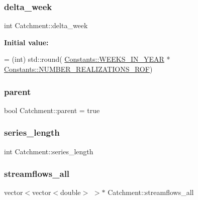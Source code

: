 \subsubsection{\texorpdfstring{delta\+\_\+week}{delta\_week}}
{\footnotesize\ttfamily int Catchment\+::delta\+\_\+week\hspace{0.3cm}{\ttfamily [protected]}}

{\bfseries Initial value\+:}
\begin{DoxyCode}
= (int) std::round(
            \mbox{\hyperlink{namespaceConstants_a19e84af3cbc6e1318beb22408c2a1f2f}{Constants::WEEKS\_IN\_YEAR}} * 
      \mbox{\hyperlink{namespaceConstants_ad6b1922ee031afa4b93176968d060fdf}{Constants::NUMBER\_REALIZATIONS\_ROF}})
\end{DoxyCode}
\mbox{\label{classCatchment_a472ff6892f90d94b8c4dba53c462dedf}} 
\subsubsection{\texorpdfstring{parent}{parent}}
{\footnotesize\ttfamily bool Catchment\+::parent = true\hspace{0.3cm}{\ttfamily [protected]}}

\mbox{\label{classCatchment_a2d4994220f63b876348b4ce4892bc6d3}} 
\subsubsection{\texorpdfstring{series\+\_\+length}{series\_length}}
{\footnotesize\ttfamily int Catchment\+::series\+\_\+length\hspace{0.3cm}{\ttfamily [protected]}}

\mbox{\label{classCatchment_a579ccda86831f286c19c76354e7125c3}} 
\subsubsection{\texorpdfstring{streamflows\+\_\+all}{streamflows\_all}}
{\footnotesize\ttfamily vector$<$vector$<$double$>$ $>$$\ast$ Catchment\+::streamflows\+\_\+all\hspace{0.3cm}{\ttfamily [protected]}}

